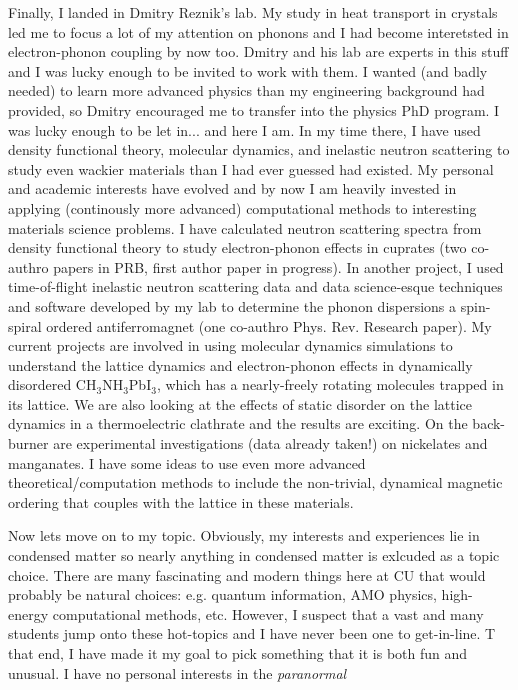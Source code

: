 \documentclass[prb,aps,11pt,superscriptaddress,floatfix]{revtex4-2}
\begin{document}
Finally, I landed in Dmitry Reznik's lab. My study in heat transport in crystals led me to focus a lot of my attention on phonons and I had become interetsted in electron-phonon coupling by now too. Dmitry and his lab are experts in this stuff and I was lucky enough to be invited to work with them. I wanted (and badly needed) to learn more advanced physics than my engineering background had provided, so Dmitry encouraged me to transfer into the physics PhD program. I was lucky enough to be let in... and here I am. In my time there, I have used density functional theory, molecular dynamics, and inelastic neutron scattering to study even wackier materials than I had ever guessed had existed. My personal and academic interests have evolved and by now I am heavily invested in applying (continously more advanced) computational methods to interesting materials science problems. I have calculated neutron scattering spectra from density functional theory to study electron-phonon effects in cuprates (two co-authro papers in PRB, first author paper in progress). In another project, I used time-of-flight inelastic neutron scattering data and data science-esque techniques and software developed by my lab to determine the phonon dispersions a spin-spiral ordered antiferromagnet (one co-authro Phys. Rev. Research paper). My current projects are involved in using molecular dynamics simulations to understand the lattice dynamics and electron-phonon effects in dynamically disordered CH$_3$NH$_3$PbI$_3$, which has a nearly-freely rotating molecules trapped in its lattice. We are also looking at the effects of static disorder on the lattice dynamics in a thermoelectric clathrate and the results are exciting. On the back-burner are experimental investigations (data already taken!) on nickelates and manganates. I have some ideas to use even more advanced theoretical/computation methods to include the non-trivial, dynamical magnetic ordering that couples with the lattice in these materials.

Now lets move on to my topic. Obviously, my interests and experiences lie in condensed matter so nearly anything in condensed matter is exlcuded as a topic choice. There are many fascinating and modern things here at CU that would probably be natural choices: e.g. quantum information, AMO physics, high-energy computational methods, etc. However, I suspect that a vast and many students jump onto these hot-topics and I have never been one to get-in-line. T that end, I have made it my goal to pick something that it is both fun and unusual. I have no personal interests in the \emph{paranormal}
\end{document}
